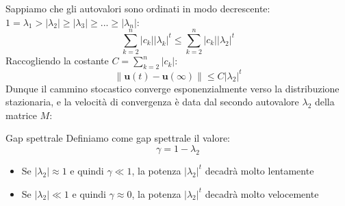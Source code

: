 Sappiamo che gli autovalori sono ordinati in modo decrescente: $1=\lambda_1 > \left\lvert \lambda_2\right\rvert \ge \left\lvert \lambda_3\right\rvert \ge ... \ge \left\lvert \lambda_n\right\rvert  $:
\begin{equation}
    \sum_{k=2}^{n}\left\lvert c_k\right\rvert \left\lvert \lambda_k\right\rvert^t \le \sum_{k=2}^{n}\left\lvert c_k\right\rvert \left\lvert \lambda_2\right\rvert^t 
\end{equation}
Raccogliendo la costante $C=\sum_{k=2}^{n}\left\lvert c_k\right\rvert $:
\begin{equation}
    \left\lVert \mathbf{u}(t)-\mathbf{u}(\infty)\right\rVert \le C \left\lvert \lambda_2\right\rvert ^t 
\end{equation}
Dunque il cammino stocastico converge esponenzialmente verso la distribuzione stazionaria, e la velocità di convergenza è data dal secondo autovalore $\lambda_2$ della matrice $M$:

\begin{boxb}{Gap spettrale}
Definiamo come gap spettrale il valore:
\begin{equation}
    \gamma=1-\lambda_2
\end{equation}
\end{boxb}
\begin{itemize}
    \item Se $\left\lvert \lambda_2\right\rvert \approx 1$ e quindi $\gamma \ll 1$, la potenza $ \left\lvert \lambda_2\right\rvert ^t$ decadrà molto lentamente
    \item Se $\left\lvert \lambda_2\right\rvert \ll 1$ e quindi $\gamma \approx 0$, la potenza $ \left\lvert \lambda_2\right\rvert ^t$ decadrà molto velocemente
\end{itemize}

